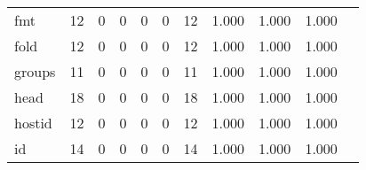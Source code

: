 \begin{longtable}{lp{1.2cm}p{1.2cm}p{1.2cm}p{1.2cm}p{1.2cm}p{1.2cm}p{1.2cm}p{1.2cm}p{1.2cm}p{1.2cm}}
fmt       &                                    12 &                                                  0 &                                                  0 &                                                  0 &                                                  0 &                                                 12 &                                         1.000 &                                              1.000 &                                              1.000 \\
fold      &                                    12 &                                                  0 &                                                  0 &                                                  0 &                                                  0 &                                                 12 &                                         1.000 &                                              1.000 &                                              1.000 \\
groups    &                                    11 &                                                  0 &                                                  0 &                                                  0 &                                                  0 &                                                 11 &                                         1.000 &                                              1.000 &                                              1.000 \\
head      &                                    18 &                                                  0 &                                                  0 &                                                  0 &                                                  0 &                                                 18 &                                         1.000 &                                              1.000 &                                              1.000 \\
hostid    &                                    12 &                                                  0 &                                                  0 &                                                  0 &                                                  0 &                                                 12 &                                         1.000 &                                              1.000 &                                              1.000 \\
id        &                                    14 &                                                  0 &                                                  0 &                                                  0 &                                                  0 &                                                 14 &                                         1.000 &                                              1.000 &                                              1.000 \\

\end{longtable}
